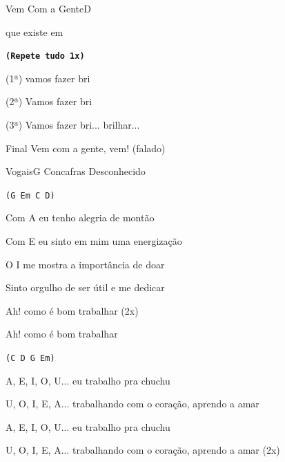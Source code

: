 \documentclass[a4,12pt,oneside]{book}
\newcommand{\RevDate}{\today}
\newcommand{\NotCCLIed}{\relax}
\begin{document}
\begin{song}{Vem Com a Gente}{D}
\begin{minipage}{0.6\columnwidth}
\begin{SBVerse}
		que existe em 

		{\normalsize\texttt{\textbf{(Repete tudo 1x)}}}
	\end{SBVerse}
	\end{minipage}
		
	\begin{SBVerse*}
		(1ª)  vamos  fazer bri
		
		(2ª) Vamos  fazer bri
		
		(3ª) Vamos  fazer bri...  brilhar...  

		\flushright\begin{SBBracket}{Final}
			\hspace*{-3cm} Vem com a gente, vem! (falado)
		\end{SBBracket}
	\end{SBVerse*}
\end{song}


\begin{song}{Vogais}{G}
  {Concafras}
  {Desconhecido}
  {}
  {\NotCCLIed}
  
	\renewcommand{\RevDate}{17 de setembro de 2015}
 
	\SBIntro[N]{\Ch{G}{} \Ch{Em}{} \Ch{C}{} \Ch{D}{}}
	
	\ifChordBk	
		\vspace{-2em}\flushright{\Gchord \quad \Emchord \quad \Cchord \quad \Dchord}
		\vspace{-1ex}
	\fi
	
	\begin{SBVerse*}
	
		\ifChordBk
			\texttt{{\small (G Em C D)}}
		\fi
	
		Com A eu tenho alegria de montão
		
		Com E eu sinto em mim uma energização
		
		O I me mostra a importância de doar
		
		Sinto orgulho de ser útil e me dedicar
		
		Ah! como é bom trabalhar (2x)

		Ah! como é bom trabalhar
	
		\ifChordBk
			\texttt{{\small (C D G Em)}}
		\fi
		
	
		A, E, I, O, U... eu trabalho pra chuchu
		
		U, O, I, E, A... trabalhando com o coração, aprendo a amar
		
		A, E, I, O, U... eu trabalho pra chuchu
		
		U, O, I, E, A... trabalhando com o coração, aprendo a amar (2x)
	\end{SBVerse*}
\end{song}
\end{document}
